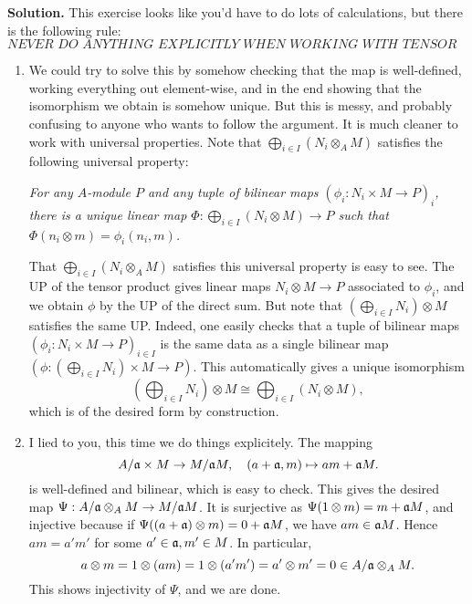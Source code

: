 \documentclass[a4paper,11pt]{article}
\begin{document}
\textbf{Solution.} 
This exercise looks like you'd have to do lots of calculations, but there is the
following rule:
\begin{equation*}
    \textit{NEVER DO ANYTHING EXPLICITLY WHEN WORKING WITH TENSOR PRODUCTS.}
\end{equation*}
\begin{enumerate}
    \item We could try to solve this by somehow checking that the map is
        well-defined, working everything out element-wise, and in the end
        showing that the isomorphism we obtain is somehow unique. But this is
        messy, and probably confusing to anyone who wants to follow the
        argument. It is much cleaner to work with universal properties. 
        Note that $\bigoplus_{i \in I} (N_i \otimes_A M)$ satisfies the
        following universal
        property: 
        \begin{center}
        \textit{For any $A$-module $P$ and any tuple of bilinear maps
        $(\phi_i: N_i \times M \to P)_i$,} \\ \textit{there is a unique linear map 
        $\Phi: \bigoplus_{i \in I} (N_i \otimes M) \to P$ such that 
        $\Phi(n_i \otimes m) = \phi_i(n_i, m)$.}
        \end{center}
        That $\bigoplus_{i \in I} (N_i \otimes_A M)$ satisfies this 
        universal property is easy to see. The UP of the tensor product
        gives linear maps $N_i \otimes M \to P$ associated to $\phi_i$, and
        we obtain $\phi$ by the UP of the direct sum. But note that 
        $(\bigoplus_{i \in I} N_i) \otimes M$ satisfies the same UP. Indeed, one 
        easily checks that a tuple of bilinear maps $(\phi_i: N_i \times M \to
        P)_{i \in I}$ is the same data as a single bilinear map $(\phi:
        (\bigoplus_{i \in I} N_i) \times M \to P)$. 
        This automatically gives a unique isomorphism 
        \begin{equation*}
            (\bigoplus_{i \in I} N_i) \otimes M   \cong
            \bigoplus_{i \in I} (N_i \otimes M),
        \end{equation*}
        which is of the desired form by construction.

    \item I lied to you, this time we do things explicitely. The mapping
            \begin{equation*}
                A/\mathfrak{a} \times M \to M / \mathfrak{a} M, \quad (a + \mathfrak{a}, m) \mapsto 
                am + \mathfrak{a} M.
            \end{equation*}
            is well-defined and bilinear, which is easy to check. This gives the
            desired map $\Psi: A/\mathfrak{a} \otimes_A M \to M/\mathfrak{a} M$. It is surjective 
            as $\Psi(1 \otimes m) = m + \mathfrak{a} M$, and injective because if 
            $\Psi((a + \mathfrak{a}) \otimes m) = 0 + \mathfrak{a} M$, we have $am \in \mathfrak{a} M$.
            Hence $am = a' m'$ for some $a' \in \mathfrak{a}, m' \in M$. In particular,
            $$a \otimes m = 1 \otimes (am) = 1 \otimes (a' m') = a' \otimes m' = 0
            \in A/\mathfrak{a} \otimes_A M.$$ 
            This shows injectivity of $\Psi$, and we are done.
\end{enumerate}
\end{document}
